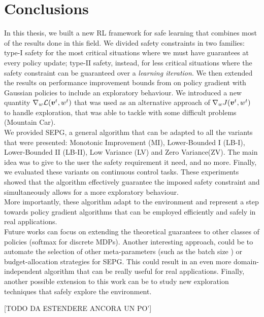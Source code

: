\chapter{Conclusions}
\label{ch:conclusion}
\thispagestyle{empty}

In this thesis, we built a new RL framework for safe learning that combines most of the results done in this field. We divided safety constraints in two families: type-I safety for the most critical situations where we must have guarantees at every policy update; type-II safety, instead, for less critical situations where the safety constraint can be guaranteed over a \textit{learning iteration}. 
We then extended the results on performance improvement bounds from \cite{adaptive_batch,adaptive_step} on policy gradient with Gaussian policies to include an exploratory behaviour. We introduced a new quantity $\nabla_{w}\mathcal{L}(\boldsymbol{v}^t, w^t)$ that was used as an alternative approach of $\nabla_w J(\boldsymbol{v}^t, w^t)$ to handle exploration, that was able to tackle with some difficult problems (Mountain Car).\\
We provided SEPG, a general algorithm that can be adapted to all the variants that were presented: Monotonic Improvement (MI), Lower-Bounded I (LB-I), Lower-Bounded II (LB-II), Low Variance (LV) and Zero Variance(ZV). The main idea was to give to the user the safety requirement it need, and no more. Finally, we evaluated these variants on continuous control tasks. These experiments showed that the algorithm effectively guarantee the imposed safety constraint and simultaneously allows for a more exploratory behaviour. \\
More importantly, these algorithm adapt to the environment and represent a step towards policy gradient algorithms that can be employed efficiently and safely in real applications. \\
Future works can focus on extending the theoretical guarantees to other classes of policies (\eg softmax for discrete MDPs). Another interesting approach, could be to automate the selection of other meta-parameters (such as the batch size \cite{adaptive_batch}) or budget-allocation strategies for SEPG. This could result in an even more domain-independent algorithm that can be really useful for real applications. Finally, another possible extension to this work can be to study new exploration techniques that safely explore the environment. 

[TODO DA ESTENDERE ANCORA UN PO']
